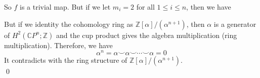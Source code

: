 \documentclass[12pt]{amsart}
\newcommand{\C}{\mathbb{C}}
\newcommand{\Z}{\mathbb{Z}}
\begin{document}
So $f$ is a trivial map. But if we let $m_i=2$ for all $1\leq i\leq n$, then we have 
\begin{center}
\end{center}
But if we identity the cohomology ring as $\Z[\alpha]/(\alpha^{n+1})$, then $\alpha$ is a generator of $H^2(\C P^n;\Z)$ and the cup product gives the algebra multiplication (ring multiplication). Therefore, we have 
\[\alpha^n=\alpha\smile\alpha\smile\cdots\smile\alpha=0\]
It contradicts with the ring structure of $\Z[\alpha]/(\alpha^{n+1})$.
\\\qed\\
\end{document}
